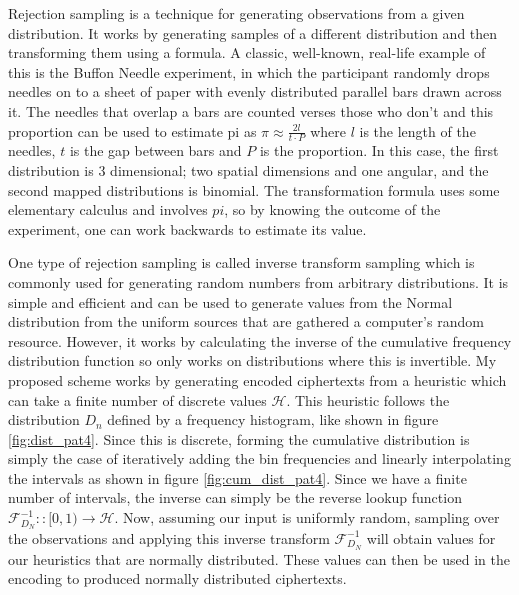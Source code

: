 \documentclass[10pt,a4paper]{article}
\begin{document}
Rejection sampling is a technique for generating observations from a given distribution. It works by generating samples of a different distribution and then transforming them using a formula.
A classic, well-known, real-life example of this is the Buffon Needle experiment, in which the participant randomly drops needles on to a sheet of paper with evenly distributed parallel bars drawn across it.
The needles that overlap a bars are counted verses those who don't and this proportion can be used to estimate pi as $\pi \approx \frac{2l}{t \cdot P}$ where $l$ is the length of the needles, $t$ is the gap between bars and $P$ is the proportion.
In this case, the first distribution is 3 dimensional; two spatial dimensions and one angular, and the second mapped distributions is binomial.
The transformation formula uses some elementary calculus and involves $pi$, so by knowing the outcome of the experiment, one can work backwards to estimate its value.

One type of rejection sampling is called inverse transform sampling which is commonly used for generating random numbers from arbitrary distributions.
It is simple and efficient and can be used to generate values from the Normal distribution from the uniform sources that are gathered a computer's random resource.
However, it works by calculating the inverse of the cumulative frequency distribution function so only works on distributions where this is invertible.
My proposed scheme works by generating encoded ciphertexts from a heuristic which can take a finite number of discrete values $\mathcal{H}$.
This heuristic follows the distribution $D_n$ defined by a frequency histogram, like shown in figure \ref{fig:dist_pat4}.
Since this is discrete, forming the cumulative distribution is simply the case of iteratively adding the bin frequencies and linearly interpolating the intervals as shown in figure \ref{fig:cum_dist_pat4}.
Since we have a finite number of intervals, the inverse can simply be the reverse lookup function $\mathcal{F}^{-1}_{D_N} :: [0,1) \rightarrow \mathcal{H}$.
Now, assuming our input is uniformly random, sampling over the observations and applying this inverse transform $\mathcal{F}^{-1}_{D_N}$ will obtain values for our heuristics that are normally distributed.
These values can then be used in the encoding to produced normally distributed ciphertexts.
\end{document}
